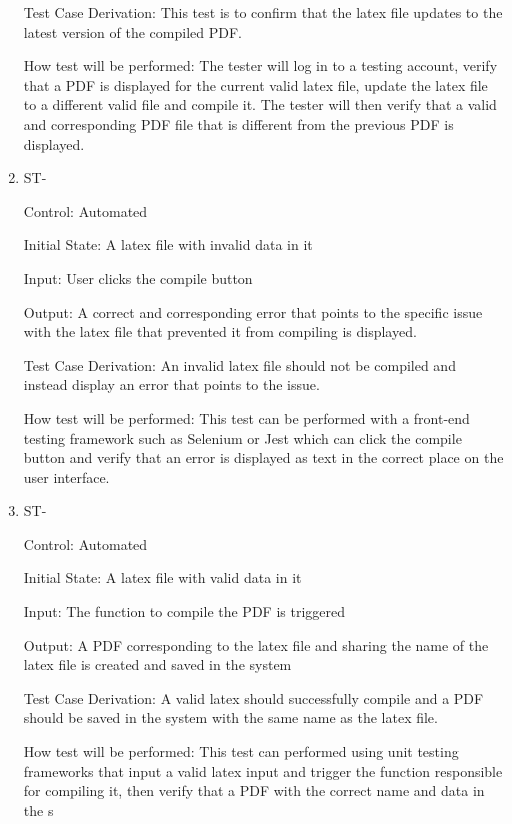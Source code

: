 \documentclass[12pt, titlepage]{article}
\newcounter{TESTID}
\newcommand\TESTNUM{\stepcounter{TESTID}\theTESTID}
\begin{document}
\begin{enumerate}
		Test Case Derivation: This test is to confirm that the latex file updates to the latest version of the compiled PDF.
		
		How test will be performed: The tester will log in to a testing account, verify that a PDF is displayed for the current valid latex file, update the latex file to a different valid file and compile it. The tester will then verify that a valid and corresponding PDF file that is different from the previous PDF is displayed.
		
		\item{ST-\TESTNUM\\}
		
		Control: Automated
		
		Initial State: A latex file with invalid data in it
		
		Input: User clicks the compile button
		
		Output: A correct and corresponding error that points to the specific issue with the latex file that prevented it from compiling is displayed.
		
		Test Case Derivation: An invalid latex file should not be compiled and instead display an error that points to the issue.
		
		How test will be performed: This test can be performed with a front-end testing framework such as Selenium or Jest which can click the compile button and verify that an error is displayed as text in the correct place on the user interface.
		
		\item{ST-\TESTNUM\\}
		
		Control: Automated
		
		Initial State: A latex file with valid data in it
		
		Input: The function to compile the PDF is triggered
		
		Output: A PDF corresponding to the latex file and sharing the name of the latex file is created and saved in the system
		
		Test Case Derivation: A valid latex should successfully compile and a PDF should be saved in the system with the same name as the latex file.
		
		How test will be performed: This test can performed using unit testing frameworks that input a valid latex input and trigger the function responsible for compiling it, then verify that a PDF with the correct name and data in the s 
		
	\end{enumerate}
	
\end{document}
